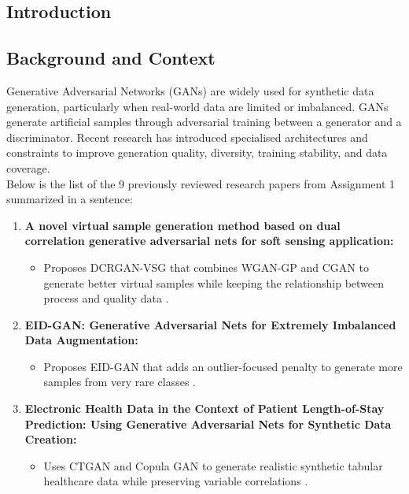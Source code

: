 \documentclass[12pt,a4paper]{report}
\begin{document}
\begin{justify}

\chapter{Introduction}

\section{Background and Context}

Generative Adversarial Networks (GANs) are widely used for synthetic data generation, particularly when real-world data are limited or imbalanced. GANs generate artificial samples through adversarial training between a generator and a discriminator. Recent research has introduced specialised architectures and constraints to improve generation quality, diversity, training stability, and data coverage. \\

Below is the list of the 9 previously reviewed research papers from Assignment 1 summarized in a sentence:

\begin{enumerate}
    \item \textbf{A novel virtual sample generation method based on dual correlation generative adversarial nets for soft sensing application:} \begin{itemize}
        \item Proposes DCRGAN-VSG that combines WGAN-GP and CGAN to generate better virtual samples while keeping the relationship between process and quality data \parencite{zhu2025novel}.
    \end{itemize}
    
    \item \textbf{EID-GAN: Generative Adversarial Nets for Extremely Imbalanced Data Augmentation:}
    \begin{itemize}
        \item Proposes EID-GAN that adds an outlier-focused penalty to generate more samples from very rare classes \parencite{li2023eid}.
    \end{itemize}
    
    \item \textbf{Electronic Health Data in the Context of Patient Length-of-Stay Prediction: Using Generative Adversarial Nets for Synthetic Data Creation:}
    \begin{itemize}
        \item Uses CTGAN and Copula GAN to generate realistic synthetic tabular healthcare data while preserving variable correlations \parencite{bietsch2023electronic}.
    \end{itemize}
    

\end{enumerate}
\end{justify}
\end{document}
